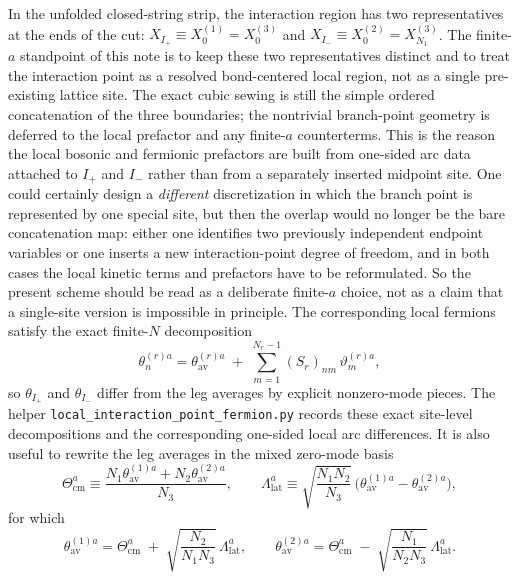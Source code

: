 \documentclass[11pt]{article}
\begin{document}
In the unfolded closed-string strip, the interaction region has two representatives at the ends of the cut: $X_{I_+} \equiv X_0^{(1)} = X_0^{(3)}$ and $X_{I_-} \equiv X_0^{(2)} = X_{N_1}^{(3)}$.
The finite-$a$ standpoint of this note is to keep these two representatives distinct and to treat the interaction point as a resolved bond-centered local region, not as a single pre-existing lattice site. The exact cubic sewing is still the simple ordered concatenation of the three boundaries; the nontrivial branch-point geometry is deferred to the local prefactor and any finite-$a$ counterterms. This is the reason the local bosonic and fermionic prefactors are built from one-sided arc data attached to $I_+$ and $I_-$ rather than from a separately inserted midpoint site. One could certainly design a \emph{different} discretization in which the branch point is represented by one special site, but then the overlap would no longer be the bare concatenation map: either one identifies two previously independent endpoint variables or one inserts a new interaction-point degree of freedom, and in both cases the local kinetic terms and prefactors have to be reformulated. So the present scheme should be read as a deliberate finite-$a$ choice, not as a claim that a single-site version is impossible in principle.
The corresponding local fermions satisfy the exact finite-$N$ decomposition
\begin{equation}
\theta_n^{(r)a}
=
\theta_{\mathrm{av}}^{(r)a}
\;+\;
\sum_{m=1}^{N_r-1}(S_r)_{nm}\,\vartheta_m^{(r)a},
\label{eq:theta-site-split}
\end{equation}
so $\theta_{I_+}$ and $\theta_{I_-}$ differ from the leg averages by explicit nonzero-mode pieces. The helper \texttt{local\_interaction\_point\_fermion.py} records these exact site-level decompositions and the corresponding one-sided local arc differences. It is also useful to rewrite the leg averages in the mixed zero-mode basis
\begin{equation}
\Theta_{\mathrm{cm}}^a
\equiv
\frac{N_1\theta_{\mathrm{av}}^{(1)a}+N_2\theta_{\mathrm{av}}^{(2)a}}{N_3},
\qquad
\Lambda_{\mathrm{lat}}^a
\equiv
\sqrt{\frac{N_1N_2}{N_3}}\,
\bigl(\theta_{\mathrm{av}}^{(1)a}-\theta_{\mathrm{av}}^{(2)a}\bigr),
\label{eq:theta-mixed-zero-modes}
\end{equation}
for which
\begin{equation}
\theta_{\mathrm{av}}^{(1)a}
=
\Theta_{\mathrm{cm}}^a
\;+\;
\sqrt{\frac{N_2}{N_1N_3}}\,\Lambda_{\mathrm{lat}}^a,
\qquad
\theta_{\mathrm{av}}^{(2)a}
=
\Theta_{\mathrm{cm}}^a
\;-\;
\sqrt{\frac{N_1}{N_2N_3}}\,\Lambda_{\mathrm{lat}}^a.
\label{eq:theta-mixed-avg}
\end{equation}
\end{document}
